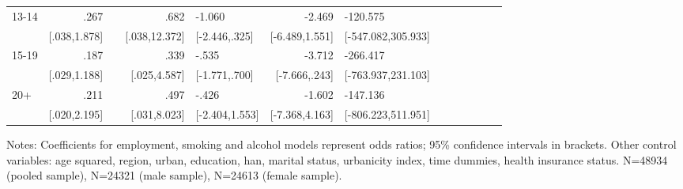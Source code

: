 \begin{table}[hp]
\begin{adjustbox}{max width=\linewidth}
\begin{threeparttable}
{\begin{tabular}{l*{6}{D{.}{.}{-1}l}}
13-14           &            .267&                &            .682&          -1.060&          -2.469&        -120.575\\
                &    [.038,1.878]&                &   [.038,12.372]&   [-2.446,.325]&  [-6.489,1.551]&[-547.082,305.933]\\

15-19           &            .187&                &            .339&           -.535&          -3.712&        -266.417\\
                &    [.029,1.188]&                &    [.025,4.587]&   [-1.771,.700]&   [-7.666,.243]&[-763.937,231.103]\\

20+             &            .211&                &            .497&           -.426&          -1.602&        -147.136\\
                &    [.020,2.195]&                &    [.031,8.023]&  [-2.404,1.553]&  [-7.368,4.163]&[-806.223,511.951]\\              
\bottomrule
\end{tabular}
\begin{tablenotes}
\item Notes: Coefficients for employment, smoking and alcohol models represent odds ratios;  95\% confidence intervals in brackets.
Other control variables: age squared, region, urban, education, han, marital status, urbanicity index, time dummies, health insurance status. N=48934 (pooled sample), N=24321 (male sample), N=24613 (female sample).

\end{tablenotes}
}
\end{threeparttable}
\end{adjustbox}
\end{table}


